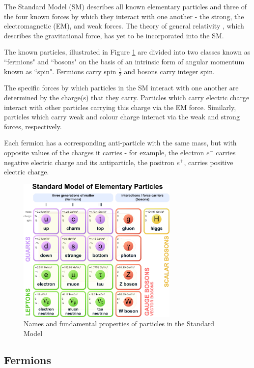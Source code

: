 The Standard Model (SM) describes all known elementary particles and three of the four known forces by which they interact with one another - the strong, the electromagnetic (EM), and weak forces. The theory of general relativity \cite{einstein_1920}, which describes the gravitational force, has yet to be incorporated into the SM. 

The known particles, illustrated in Figure \ref{fig:standard_model} are divided into two classes known as ``fermions" and ``bosons" on the basis of an intrinsic form of angular momentum known as ``spin". Fermions carry spin \(\frac{1}{2}\) and bosons carry integer spin. 

The specific forces by which particles in the SM interact with one another are determined by the charge(s) that they carry. Particles which carry electric charge interact with other particles carrying this charge via the EM force. Similarly, particles which carry weak and colour charge interact via the weak and strong forces, respectively. 

Each fermion has a corresponding anti-particle with the same mass, but with opposite values of the charges it carries - for example, the electron \(e^-\) carries negative electric charge and its antiparticle, the positron \(e^+\), carries positive electric charge. 

\begin{figure}[H]
	\centering
	\includegraphics[width=0.7\textwidth]{Figures/1/StandardModel.pdf}
	\caption[]{Names and fundamental properties of particles in the Standard Model}
	\label{fig:standard_model}
\end{figure}

\subsection{Fermions}
\label{sec:fermions}

